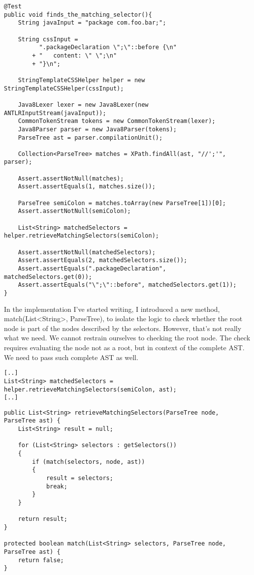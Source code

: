 \documentclass[11pt]{article}
\begin{document}
\begin{verbatim}
@Test
public void finds_the_matching_selector(){
    String javaInput = "package com.foo.bar;";

    String cssInput =
          ".packageDeclaration \";\"::before {\n"
        + "   content: \" \";\n"
        + "}\n";

    StringTemplateCSSHelper helper = new StringTemplateCSSHelper(cssInput);

    Java8Lexer lexer = new Java8Lexer(new ANTLRInputStream(javaInput));
    CommonTokenStream tokens = new CommonTokenStream(lexer);
    Java8Parser parser = new Java8Parser(tokens);
    ParseTree ast = parser.compilationUnit();

    Collection<ParseTree> matches = XPath.findAll(ast, "//';'", parser);

    Assert.assertNotNull(matches);
    Assert.assertEquals(1, matches.size());

    ParseTree semiColon = matches.toArray(new ParseTree[1])[0];
    Assert.assertNotNull(semiColon);

    List<String> matchedSelectors = helper.retrieveMatchingSelectors(semiColon);

    Assert.assertNotNull(matchedSelectors);
    Assert.assertEquals(2, matchedSelectors.size());
    Assert.assertEquals(".packageDeclaration", matchedSelectors.get(0));
    Assert.assertEquals("\";\"::before", matchedSelectors.get(1));
}
\end{verbatim}

In the implementation I've started writing, I introduced a new method, match(List<String>, ParseTree), to isolate the logic
to check whether the root node is part of the nodes described by the selectors. However, that's not really what we need. We cannot
restrain ourselves to checking the root node. The check requires evaluating the node not as a root, but in context of the complete AST.
We need to pass such complete AST as well.

\begin{verbatim}
[..]
List<String> matchedSelectors = helper.retrieveMatchingSelectors(semiColon, ast);
[..]
\end{verbatim}

\begin{verbatim}
public List<String> retrieveMatchingSelectors(ParseTree node, ParseTree ast) {
    List<String> result = null;

    for (List<String> selectors : getSelectors())
    {
        if (match(selectors, node, ast))
        {
            result = selectors;
            break;
        }
    }

    return result;
}

protected boolean match(List<String> selectors, ParseTree node, ParseTree ast) {
    return false;
}
\end{verbatim}
\end{document}
